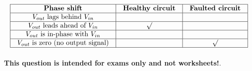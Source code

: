 $$\vbox{\offinterlineskip
\halign{\strut
\vrule \quad\hfil # \ \hfil & 
\vrule \quad\hfil # \ \hfil & 
\vrule \quad\hfil # \ \hfil \vrule \cr
\noalign{\hrule}
%
{\bf Phase shift} & {\bf Healthy circuit} & {\bf Faulted circuit} \cr
%
\noalign{\hrule}
%
$V_{out}$ lags behind $V_{in}$ &  &  \cr
%
\noalign{\hrule}
%
$V_{out}$ leads ahead of $V_{in}$ & $\surd$ &  \cr
%
\noalign{\hrule}
%
$V_{out}$ is in-phase with $V_{in}$ &  &  \cr
%
\noalign{\hrule}
%
$V_{out}$ is zero (no output signal) &  & $\surd$ \cr
%
\noalign{\hrule}
} %
}$$ %








{\bf This question is intended for exams only and not worksheets!}.



